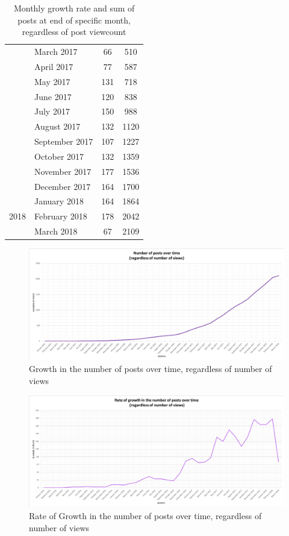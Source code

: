 \documentclass{sigchi}
\begin{document}
\begin{table}[H]
{\begin{tabular}{|c|l|c|c|}
 & March 2017 & 66 & 510 \\ \cline{2-4} 
 & April 2017 & 77 & 587 \\ \cline{2-4} 
 & May 2017 & 131 & 718 \\ \cline{2-4} 
 & June 2017 & 120 & 838 \\ \cline{2-4} 
 & July 2017 & 150 & 988 \\ \cline{2-4} 
 & August 2017 & 132 & 1120 \\ \cline{2-4} 
 & September 2017 & 107 & 1227 \\ \cline{2-4} 
 & October 2017 & 132 & 1359 \\ \cline{2-4} 
 & November 2017 & 177 & 1536 \\ \cline{2-4} 
 & December 2017 & 164 & 1700 \\ \hline
\multirow{3}{*}{2018} & January 2018 & 164 & 1864 \\ \cline{2-4} 
 & February 2018 & 178 & 2042 \\ \cline{2-4} 
 & March 2018 & 67 & 2109 \\ \hline
\end{tabular}
}
\caption{Monthly growth rate and sum of posts at end of specific month, regardless of post viewcount}
\label{table:GrowthRateAndGrowthAllViews}
\end{table}
\pagebreak

\begin{figure}[ht]
	\centering
\includegraphics[width=\textwidth,height=\textheight,keepaspectratio]{RQ4-NumPostsOverTime_AllViews.png}
    \caption{Growth in the number of posts over time, regardless of number of views}
    \label{fig:4GrowthInNumPostsAllViews}
\end{figure}
\begin{figure}[ht]
	\centering
\includegraphics[width=\textwidth,height=\textheight,keepaspectratio]{RQ4-RateNumPostsOverTime_AllViews.png}
    \caption{Rate of Growth in the number of posts over time, regardless of number of views}
    \label{fig:4.1RateGrowthInNumPostsAllViews}
\end{figure}
\end{document}
